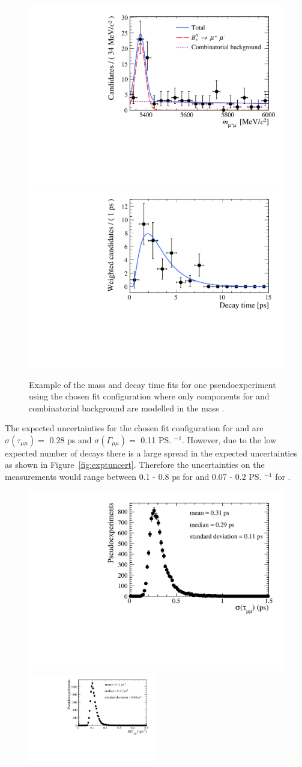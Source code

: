 {\begin{figure}[tbp]
    \centering
        \includegraphics[width= 0.49 \textwidth]{./Figs/LifetimeMeasurement/5320-6000_toy_mass.pdf}
       \includegraphics[width=0.49 \textwidth]{./Figs/LifetimeMeasurement/5320-6000_toy_lifetime.pdf}
    \caption{Example of the mass and decay time \ml fits for one pseudoexperiment using the chosen fit configuration where only components for \bsmumu and combinatorial background are modelled in the mass \pdf.}
    \label{fig:toyegs}
\end{figure}

The expected uncertainties for the chosen fit configuration for \tmumu and \Gmumu are $\sigma \left ( \tau_{\mu\mu}  \right ) = $ 0.28 ps and  $\sigma \left ( \Gamma_{\mu\mu}  \right ) = $ 0.11 \ps$^{-1}$. However, due to the low expected number of decays there is a large spread in the expected uncertainties as shown in Figure~\ref{fig:exptuncert}. Therefore the uncertainties on the measurements would range between 0.1 - 0.8 ps for \tmumu and 0.07 - 0.2 \ps$^{-1}$ for \Gmumu.


\begin{figure}[tbp]
    \centering
        \includegraphics[width=0.49 \textwidth]{./Figs/LifetimeMeasurement/5320-6000_tau_err.pdf}
        \includegraphics[width=0.49\textwidth]{./Figs/LifetimeMeasurement/5320-6000_gamma_err.pdf}


\end{figure}}
